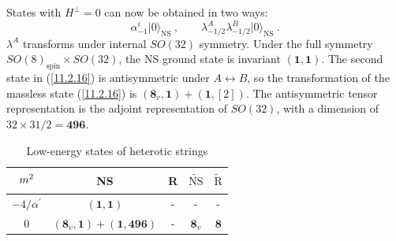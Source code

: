 States with $H^{\bot}=0$ can now be obtained in two ways:
\begin{equation}
	\alpha_{-1}^{i}\lvert 0\rangle_{\text{NS}}\:,\qquad \lambda_{-1/2}^{A}\lambda_{-1/2}^{B}\lvert 0\rangle_{\text{NS}} \:. \label{11.2.16}    
\end{equation}
$\lambda^{A}$ transforms under internal $SO(32)$ symmetry. Under the full symmetry $SO(8)_{\text{spin}}\times SO(32)$, the NS ground state is invariant $(\mathbf{1},\mathbf{1})$. The second state in (\ref{11.2.16}) is antisymmetric under $A\leftrightarrow B$, so the transformation of the massless state (\ref{11.2.16}) is $(\mathbf{8}_{v},\mathbf{1})+(\mathbf{1},[2])$. The antisymmetric tensor representation is the adjoint representation of $SO(32)$, with a dimension of $32\times 31/2=\mathbf{496}$.

\begin{table}[h]
	\caption{Low-energy states of heterotic strings}
	\label{tab:11.2}%
	\centering
	\begin{tabular}[c]{ccccc}
		\hline\hline
		$\vphantom{\Bigl[}m^{2}$ & NS & R & $\widetilde{\text{NS}}$ & $\widetilde{\text{R}}$  \\
		\hline
		$-4/\alpha^{\prime}$ & $(\mathbf{1},\mathbf{1})$ & - & - &  -  \\
		0 & $(\mathbf{8}_{v},\mathbf{1})+(\mathbf{1},\mathbf{496})$ & - & $\mathbf{8}_{v}$ & $\mathbf{8}$   \\
		\hline\hline
	\end{tabular}
\end{table}

